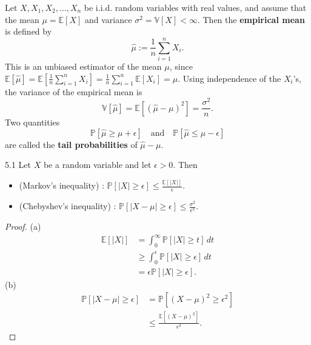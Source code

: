 \documentclass[10pt]{article}
\newenvironment{lemma*}[1]{%
  \IfBlankTF{#1}
    {\renewcommand{\themanuallemmainner}{\unskip}}
    {\renewcommand\themanuallemmainner{#1}}%
  \manuallemmainner
}{\endmanuallemmainner}
\theoremstyle{definition}
\newenvironment{definition*}[1]{%
  \IfBlankTF{#1}
    {\renewcommand{\themanualdefinitioninner}{\unskip}}
    {\renewcommand\themanualdefinitioninner{#1}}%
  \manualdefinitioninner
}{\endmanualdefinitioninner}
\begin{document}
\begin{definition*}{}
    Let $X, X_1, X_2, \ldots, X_n$ be i.i.d. random variables with real values, 
    and assume that the mean $\mu = \mathbb{E}[X] $ and variance $\sigma^2 = \mathbb{V}[X] < \infty$.
    Then the \textbf{empirical mean} is defined by
    \begin{equation*}
        \hat{\mu} := \frac{1}{n} \sum_{i=1}^n X_i.
    \end{equation*}
    This is an unbiased estimator of the mean $\mu$, since $\mathbb{E}[\hat{\mu}] = \mathbb{E}\left[\frac{1}{n} \sum_{i=1}^n X_i\right] = \frac{1}{n} \sum_{i=1}^n \mathbb{E}[X_i] = \mu$.
    Using independence of the $X_i$'s, the variance of the empirical mean is
    \begin{equation*}
        \mathbb{V}[\hat{\mu}] = \mathbb{E}\left[(\hat{\mu} - \mu)^2\right] = \frac{\sigma^2}{n}.
    \end{equation*}
    Two quantities 
    \begin{equation*}
        \mathbb{P}[\hat{\mu}\geq \mu + \epsilon] \quad \text{and} \quad \mathbb{P}[\hat{\mu}\leq \mu - \epsilon]
    \end{equation*}
    are called the \textbf{tail probabilities} of $\hat{\mu}-\mu$.
\end{definition*}

\begin{lemma*}{5.1}
    Let $X$ be a random variable and let $\epsilon > 0$. Then
    \begin{itemize}
        \item[(a)] (Markov's inequality) : $\mathbb{P}[|X| \geq \epsilon] \leq \frac{\mathbb{E}[|X|]}{\epsilon}$.
        \item[(b)] (Chebyshev's inequality) : $\mathbb{P}[|X - \mu| \geq \epsilon] \leq \frac{\sigma^2}{\epsilon^2}$.
    \end{itemize}
\end{lemma*}

\begin{proof}
    (a)
    \begin{align*}
        \mathbb{E}[|X|] &= \int_0^\infty \mathbb{P}[|X| \geq t] \, dt \\
        &\geq \int_0^\epsilon \mathbb{P}[|X| \geq \epsilon] \, dt \\
        &= \epsilon \mathbb{P}[|X| \geq \epsilon].
    \end{align*}
    (b)
    \begin{align*}
        \mathbb{P}[|X - \mu| \geq \epsilon] &= \mathbb{P}[(X - \mu)^2 \geq \epsilon^2] \\
        &\leq \frac{\mathbb{E}[(X - \mu)^2]}{\epsilon^2}.
    \end{align*}
\end{proof}
\end{document}
